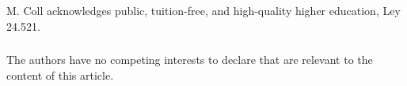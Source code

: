 \documentclass[runningheads]{llncs}
\begin{document}
\begin{credits}
\subsubsection{\ackname}
M. Coll acknowledges public, tuition-free, and high-quality higher education, Ley 24.521.

\subsubsection{\discintname}
The authors have no competing interests to declare that are
relevant to the content of this article.
\end{credits}
%
%
%
% 
% 
%
\printbibliography
\end{document}
